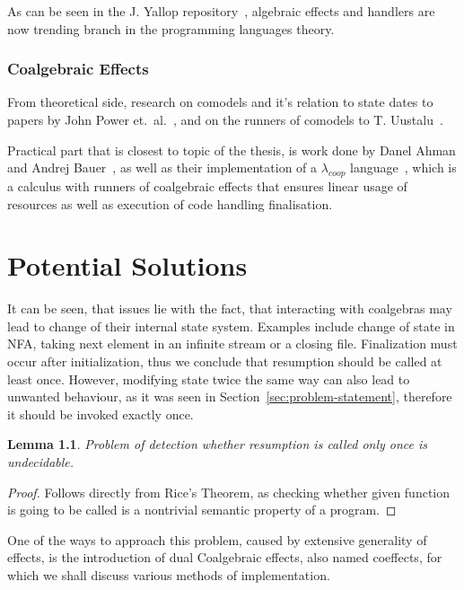 \documentclass[declaration,shortabstract]{iithesis}
\theoremstyle{definition} \newtheorem{definition}{Definition}[chapter]
\theoremstyle{remark} \newtheorem{remark}[definition]{Observation}
\theoremstyle{plain} \newtheorem{theorem}[definition]{Theorem}
\theoremstyle{plain} \newtheorem{lemma}[definition]{Lemma}
\begin{document}
    As can be seen in the J. Yallop repository~\cite{effects-bibliography}, algebraic
    effects and handlers are now trending branch in the programming languages theory.

    \subsection{Coalgebraic Effects}

    From theoretical side, research on comodels and it's relation to state
    dates to papers by John Power et.\ al.~\cite{comodels, tensors}, and on
    the runners of comodels to T. Uustalu~\cite{runners-uustalu}.

    Practical part that is closest to topic of the thesis, is work done by
    Danel Ahman and Andrej Bauer~\cite{runners-in-action}, as well as their
    implementation of a $\lambda_{coop}$ language~\cite{coop}, which is a
    calculus with runners of coalgebraic effects that ensures linear usage of
    resources as well as execution of code handling finalisation.

\chapter{Potential Solutions}\label{chapter:potential-solutions}

It can be seen, that issues lie with the fact, that interacting with coalgebras
may lead to change of their internal state system. Examples include change of
state in NFA, taking next element in an infinite stream or a closing file.
Finalization must occur after initialization, thus we conclude that resumption
should be called at least once. However, modifying state twice the same way can
also lead to unwanted behaviour, as it was seen in
Section~\ref{sec:problem-statement}, therefore it should be invoked exactly
once.

\begin{lemma}
    Problem of detection whether resumption is called only once is undecidable.
\end{lemma}
\begin{proof}
    Follows directly from Rice's Theorem, as checking whether given function is
    going to be called is a nontrivial semantic property of a program.
\end{proof}

One of the ways to approach this problem, caused by extensive generality of
effects, is the introduction of dual Coalgebraic effects, also named coeffects,
for which we shall discuss various methods of implementation.
\end{document}
